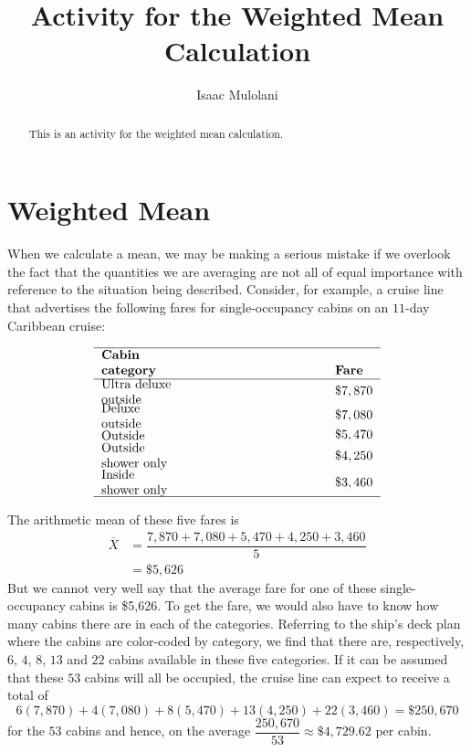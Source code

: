 \documentclass{ximera}
\title{Activity for the Weighted Mean Calculation}
\author{Isaac Mulolani}
\begin{document}
\begin{abstract}
This is an activity for the weighted mean calculation.
\end{abstract}

\maketitle

\section*{Weighted Mean}

When we calculate a mean, we may be making a serious mistake if we overlook the fact that the quantities we are averaging are not all
of equal importance with reference to the situation being described. Consider, for example, a cruise line that advertises the following fares
for single-occupancy cabins on an $11$-day Caribbean cruise:

\[
\begin{tabular}{ll}\hline
\textbf{Cabin}                        &              \\
\textbf{category}                     & \textbf{Fare} \\ \hline
\parbox{6cm}{Ultra deluxe\\outside}   & $\$7,870$  \\
\parbox{6cm}{Deluxe\\outside}         & $\$7,080$  \\
\parbox{6cm}{Outside}                 & $\$5,470$  \\
\parbox{6cm}{Outside\\shower only}    & $\$4,250$  \\
\parbox{6cm}{Inside\\shower only}     & $\$3,460$  \\ \hline
\end{tabular}
\]

The arithmetic mean of these five fares is
\begin{align*}
\overline{X} &=\dfrac{7,870+7,080+5,470+4,250+3,460}{5}\\
&=\$5,626
\end{align*}
But we cannot very well say that the average fare for one of these single-occupancy cabins is \$5,626. To get the fare, we would also have to know how many cabins there are in each of the categories. Referring to the ship's deck plan where the cabins are color-coded by category, we find that there are,
respectively, $6$, $4$, $8$, $13$ and $22$ cabins available in these five categories. If it can be assumed that these $53$ cabins will all be occupied, the cruise line can expect to receive a total of
$$
6(7,870)+4(7,080)+8(5,470)+13(4,250)+22(3,460)=\$ 250,670
$$
for the $53$ cabins and hence, on the average $\dfrac{250,670}{53}\approx \$4,729.62$ per cabin.
\end{document}
